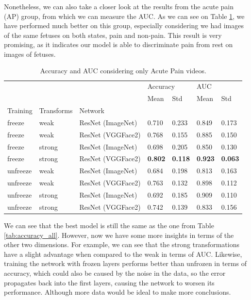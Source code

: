 Nonetheless, we can also take a closer look at the results from the acute pain (AP) group, from which we can measure the AUC. As we can see on Table \ref{tab:accuracy_auc_ap}, we have performed much better on this group, especially considering we had images of the same fetuses on both states, pain and non-pain. This result is very promising, as it indicates our model is able to discriminate pain from rest on images of fetuses.

\begin{table}[h!tp]
\centering
\caption{Accuracy and AUC considering only Acute Pain videos.}
\label{tab:accuracy_auc_ap} 
\begin{tabular}{lllllll}
\toprule
         &        &          & \multicolumn{2}{l}{Accuracy} & \multicolumn{2}{l}{AUC} \\
         &        &          &      Mean &       Std &      Mean &       Std \\
Training & Transforms & Network &           &           &           &           \\
\midrule
freeze   & weak   & ResNet (ImageNet) &  0.710 &  0.233 &  0.849 &  0.173 \\
freeze   & weak   & ResNet (VGGFace2) &  0.768 &  0.155 &  0.885 &  0.150 \\
freeze   & strong & ResNet (ImageNet) &  0.698 &  0.205 &  0.850 &  0.130 \\
freeze   & strong & ResNet (VGGFace2) &  \textbf{0.802} & \textbf{ 0.118} &  \textbf{0.923} &  \textbf{0.063} \\
unfreeze & weak   & ResNet (ImageNet) &  0.684 &  0.198 &  0.813 &  0.163 \\
unfreeze & weak   & ResNet (VGGFace2) &  0.763 &  0.132 &  0.898 &  0.112 \\
unfreeze & strong & ResNet (ImageNet) &  0.692 &  0.185 &  0.909 &  0.110 \\
unfreeze & strong & ResNet (VGGFace2) &  0.742 &  0.139 &  0.833 &  0.156 \\
\bottomrule
\end{tabular}
\end{table}

We can see that the best model is still the same as the one from Table \ref{tab:accuracy_all}. However, now we have some more insights in terms of the other two dimensions. For example, we can see that the strong transformations have a slight advantage when compared to the weak in terms of AUC. Likewise, training the network with frozen layers performs better than unfrozen in terms of accuracy, which could also be caused by the noise in the data, so the error propagates back into the first layers, causing the network to worsen its performance. Although more data would be ideal to make more conclusions.

